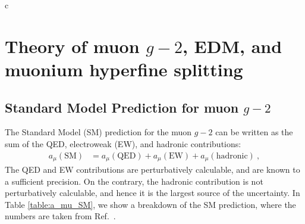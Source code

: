 c\section{Theory of muon $g-2$, EDM, and muonium hyperfine splitting}

\def\hpz{\hphantom{0}} \def\hpzz{\hphantom{00}} \def\hph{\hphantom{-}}

\subsection{Standard Model Prediction for muon $g-2$}

The Standard Model (SM) prediction for the muon $g-2$
can be written as the sum of the QED, electroweak (EW), and
hadronic contributions:
%
\begin{align}
   a_\mu(\text{SM})
&=   a_\mu(\text{QED}) +  a_\mu(\text{EW})
   + a_\mu(\text{hadronic})~,
\end{align}
%
The QED and EW contributions are perturbatively calculable,
and are known to a sufficient precision.  On the contrary,
the hadronic contribution is not perturbatively calculable,
and hence it is the largest source of the uncertainty.
In Table \ref{table:a_mu_SM}, we show a breakdown of the
SM prediction, where the numbers are taken from Ref.~\cite{KNT18}.


